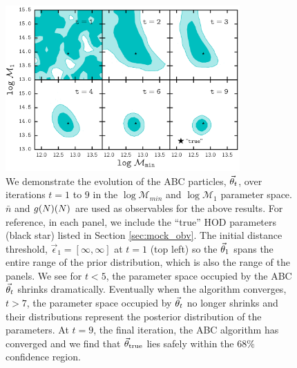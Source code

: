\begin{figure}
\includegraphics[width=0.8\textwidth]{figures/abc/paper_ABC_poolevolution_nbargmf.pdf}
\caption{\label{fig:pool_demo} We demonstrate the evolution of the ABC particles, $\vec{\theta}_t$, over iterations $t = 1$ to $9$ in the $\log \mathcal{M}_{min}$ and $\log \mathcal{M}_1$ parameter space. 
$\bar{n}$ and $g(N)(N)$ are used as observables for the above results. For reference, 
in each panel, we include the ``true'' HOD parameters (black star) listed in 
Section \ref{sec:mock_obv}. The initial distance threshold, $\vec\epsilon_1 = 
[\infty, \infty]$ at $t=1$ (top left) so the $\vec{\theta}_1$ spans the entire range of the prior distribution, 
which is also the range of the panels. We see for $t < 5$, the parameter space occupied 
by the ABC $\vec{\theta}_t$ shrinks dramatically. Eventually when the algorithm converges, 
$t > 7$, the parameter space occupied by $\vec{\theta}_t$ no longer shrinks and their 
distributions represent the posterior distribution of the 
parameters. At $t=9$, the final iteration, the ABC algorithm has converged and 
we find that $\vec{\theta}_\mathrm{true}$ lies safely within the $68\%$ confidence region.} 
\end{figure}

